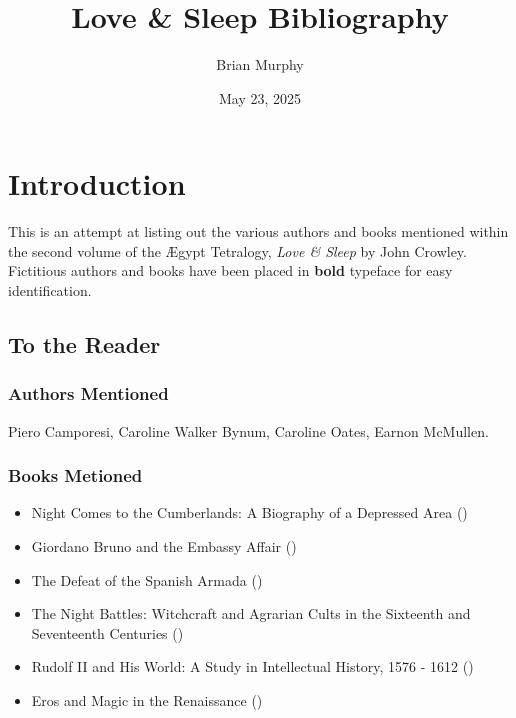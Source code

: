 \documentclass[
]{article}
\title{Love \& Sleep Bibliography}
\author{Brian Murphy}
\date{May 23, 2025}
\providecommand{\tightlist}{%
  \setlength{\itemsep}{0pt}\setlength{\parskip}{0pt}}
\begin{document}
\maketitle

\section{Introduction}\label{introduction}

This is an attempt at listing out the various authors and books
mentioned within the second volume of the Ægypt Tetralogy, \emph{Love \&
Sleep} by John Crowley. Fictitious authors and books have been placed in
\textbf{bold} typeface for easy identification.

\subsection{To the Reader}\label{to-the-reader}

\subsubsection{Authors Mentioned}\label{authors-mentioned}

Piero Camporesi, Caroline Walker Bynum, Caroline Oates, Earnon McMullen.

\subsubsection{Books Metioned}\label{books-metioned}

\begin{itemize}
\tightlist
\item
  Night Comes to the Cumberlands: A Biography of a Depressed Area
  ()
\item
  Giordano Bruno and the Embassy Affair ()
\item
  The Defeat of the Spanish Armada
  ()
\item
  The Night Battles: Witchcraft and Agrarian Cults in the Sixteenth and
  Seventeenth Centuries ()
\item
  Rudolf II and His World: A Study in Intellectual History, 1576 - 1612
  ()
\item
  Eros and Magic in the Renaissance ()
\end{itemize}
\end{document}
